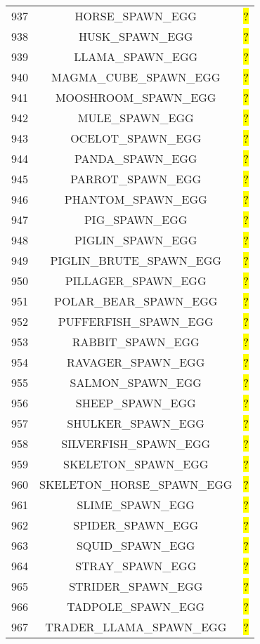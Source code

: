 \documentclass[11pt]{article}
\newcommand\myworries[1]{\sethlcolor{red}\hl{#1}}
\begin{document}
\begin{longtable}{ |c|c|c| }
937 & HORSE\_SPAWN\_EGG & \myworries{?} \\
938 & HUSK\_SPAWN\_EGG & \myworries{?} \\
939 & LLAMA\_SPAWN\_EGG & \myworries{?} \\
940 & MAGMA\_CUBE\_SPAWN\_EGG & \myworries{?} \\
941 & MOOSHROOM\_SPAWN\_EGG & \myworries{?} \\
942 & MULE\_SPAWN\_EGG & \myworries{?} \\
943 & OCELOT\_SPAWN\_EGG & \myworries{?} \\
944 & PANDA\_SPAWN\_EGG & \myworries{?} \\
945 & PARROT\_SPAWN\_EGG & \myworries{?} \\
946 & PHANTOM\_SPAWN\_EGG & \myworries{?} \\
947 & PIG\_SPAWN\_EGG & \myworries{?} \\
948 & PIGLIN\_SPAWN\_EGG & \myworries{?} \\
949 & PIGLIN\_BRUTE\_SPAWN\_EGG & \myworries{?} \\
950 & PILLAGER\_SPAWN\_EGG & \myworries{?} \\
951 & POLAR\_BEAR\_SPAWN\_EGG & \myworries{?} \\
952 & PUFFERFISH\_SPAWN\_EGG & \myworries{?} \\
953 & RABBIT\_SPAWN\_EGG & \myworries{?} \\
954 & RAVAGER\_SPAWN\_EGG & \myworries{?} \\
955 & SALMON\_SPAWN\_EGG & \myworries{?} \\
956 & SHEEP\_SPAWN\_EGG & \myworries{?} \\
957 & SHULKER\_SPAWN\_EGG & \myworries{?} \\
958 & SILVERFISH\_SPAWN\_EGG & \myworries{?} \\
959 & SKELETON\_SPAWN\_EGG & \myworries{?} \\
960 & SKELETON\_HORSE\_SPAWN\_EGG & \myworries{?} \\
961 & SLIME\_SPAWN\_EGG & \myworries{?} \\
962 & SPIDER\_SPAWN\_EGG & \myworries{?} \\
963 & SQUID\_SPAWN\_EGG & \myworries{?} \\
964 & STRAY\_SPAWN\_EGG & \myworries{?} \\
965 & STRIDER\_SPAWN\_EGG & \myworries{?} \\
966 & TADPOLE\_SPAWN\_EGG & \myworries{?} \\
967 & TRADER\_LLAMA\_SPAWN\_EGG & \myworries{?} \\

\end{longtable}
\end{document}
